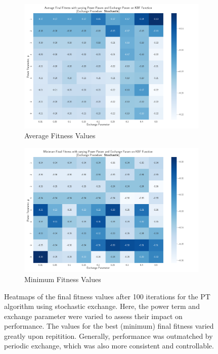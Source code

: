 \documentclass[10pt]{article}
\begin{document}
\begin{multicols}{2}
\begin{figure}[H]
    \centering
    \begin{subfigure}{0.46\textwidth}
        \centering
        \includegraphics[width=\textwidth]{../figures/Permanent Images/PT_Avg_Fitness_Heatmap_Stochastic.png}
        \caption{Average Fitness Values}
        \label{fig:avg_stochastic_heatmap}
    \end{subfigure}
    \begin{subfigure}{0.46\textwidth}
        \centering
        \includegraphics[width=\textwidth]{../figures/Permanent Images/PT_Min_Fitness_Heatmap_Stochastic.png}
        \caption{Minimum Fitness Values}
        \label{fig:min_stochastic_heatmap}
    \end{subfigure}
    \captionsetup{justification=centering}
    \caption{Heatmaps of the final fitness values after 100 iterations for the PT algorithm using stochastic exchange. Here, the power term and exchange parameter were varied to assess their impact on performance. The values for the best (minimum) final fitness varied greatly upon repitition. Generally, performance was outmatched by periodic exchange, which was also more consistent and controllable.}
    \label{fig:heatmap_stochastic}
\end{figure}
\end{multicols}
\end{document}

